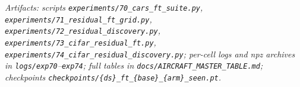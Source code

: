 \documentclass[11pt]{article}
\begin{document}
\vspace{1em}
\noindent\textit{Artifacts: scripts \texttt{experiments/70\_cars\_ft\_suite.py},
\texttt{experiments/71\_residual\_ft\_grid.py},
\texttt{experiments/72\_residual\_discovery.py},
\texttt{experiments/73\_cifar\_residual\_ft.py},
\texttt{experiments/74\_cifar\_residual\_discovery.py}; per-cell logs and
npz archives in \texttt{logs/exp70}--\texttt{exp74}; full tables in
\texttt{docs/AIRCRAFT\_MASTER\_TABLE.md}; checkpoints
\texttt{checkpoints/\{ds\}\_ft\_\{base\}\_\{arm\}\_seen.pt}.}
\end{document}
